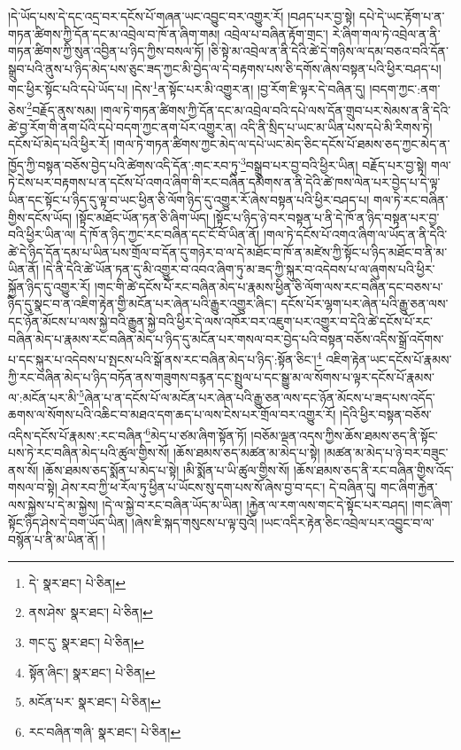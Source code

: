 །དེ་ཡོད་པས་དེ་དང་འདྲ་བར་དངོས་པོ་གཞན་ཡང་འབྱུང་བར་འགྱུར་རོ། །བཤད་པར་བྱ་སྟེ། དཔེ་དེ་ཡང་རྟོག་པ་ན་གཏན་ཚིགས་ཀྱི་དོན་དང་མ་འབྲེལ་བ་ཁོ་ན་ཞིག་གམ། འབྲེལ་པ་བཞིན་རྟོག་གྲང་། རེ་ཞིག་གལ་ཏེ་འབྲེལ་ན་ནི་གཏན་ཚིགས་ཀྱི་སུན་འབྱིན་པ་ཉིད་ཀྱིས་བསལ་ཏོ། །ཅི་སྟེ་མ་འབྲེལ་ན་ནི་དེའི་ཚེ་དེ་གཉིས་ལ་དམ་བཅའ་བའི་དོན་སྒྲུབ་པའི་ནུས་པ་ཉིད་མེད་པས་ཅུང་ཟད་ཀྱང་མི་བྱེད་ལ་དེ་བརྟགས་པས་ཅི་དགོས་ཞེས་བསྟན་པའི་ཕྱིར་བཤད་པ། གང་ཕྱིར་སྟོང་པའི་དཔེ་ཡོད་པ། །དེས་\footnote{དེ་  སྣར་ཐང་།  པེ་ཅིན། }ན་སྟོང་པར་མི་འགྱུར་ན། །བྱ་རོག་ཇི་ལྟར་དེ་བཞིན་དུ། །བདག་ཀྱང་:ནག་ཅེས་\footnote{ནས་ཤེས་  སྣར་ཐང་།  པེ་ཅིན། }བརྗོད་ནུས་སམ། །གལ་ཏེ་གཏན་ཚིགས་ཀྱི་དོན་དང་མ་འབྲེལ་བའི་དཔེ་ལས་དོན་གྲུབ་པར་སེམས་ན་ནི་དེའི་ཚེ་བྱ་རོག་གི་ནག་པོའི་དཔེ་བདག་ཀྱང་ནག་པོར་འགྱུར་ན། འདི་ནི་སྲིད་པ་ཡང་མ་ཡིན་པས་དཔེ་མི་རིགས་ཏེ། དངོས་པོ་མེད་པའི་ཕྱིར་རོ། །གལ་ཏེ་གཏན་ཚིགས་ཀྱང་མེད་ལ་དཔེ་ཡང་མེད་ཅིང་དངོས་པོ་ཐམས་ཅད་ཀྱང་མེད་ན་ཁྱོད་ཀྱི་བསྟན་བཅོས་བྱེད་པའི་ཚེགས་འདི་དོན་:གང་རབ་ཏུ་\footnote{གང་དུ་  སྣར་ཐང་།  པེ་ཅིན། }བསྒྲུབ་པར་བྱ་བའི་ཕྱིར་ཡིན། བརྗོད་པར་བྱ་སྟེ། གལ་ཏེ་ངེས་པར་བརྟགས་པ་ན་དངོས་པོ་འགའ་ཞིག་གི་རང་བཞིན་དམིགས་ན་ནི་དེའི་ཚེ་ཁས་ལེན་པར་བྱེད་པ་དེ་ལྟ་ཡིན་དང་སྟོང་པ་ཉིད་དུ་ལྟ་བ་ཡང་ཕྱིན་ཅི་ལོག་ཉིད་དུ་འགྱུར་རོ་ཞེས་བསྟན་པའི་ཕྱིར་བཤད་པ། གལ་ཏེ་རང་བཞིན་གྱིས་དངོས་ཡོད། །སྟོང་མཐོང་ཡོན་ཏན་ཅི་ཞིག་ཡོད། །སྟོང་པ་ཉིད་ཉེ་བར་བསྟན་པ་ནི་དེ་ཁོ་ན་ཉིད་བསྟན་པར་བྱ་བའི་ཕྱིར་ཡིན་ལ། དེ་ཁོ་ན་ཉིད་ཀྱང་རང་བཞིན་དང་ངོ་བོ་ཡིན་ནོ། །གལ་ཏེ་དངོས་པོ་འགའ་ཞིག་ལ་ཡོད་ན་ནི་དེའི་ཚེ་དེ་ཉིད་དོན་དམ་པ་ཡིན་པས་གྲོལ་བ་དོན་དུ་གཉེར་བ་ལ་དེ་མཐོང་བ་ཁོ་ན་མཛེས་ཀྱི་སྟོང་པ་ཉིད་མཐོང་བ་ནི་མ་ཡིན་ནོ། །དེ་ནི་དེའི་ཚེ་ཡོན་ཏན་དུ་མི་འགྱུར་བ་འབའ་ཞིག་ཏུ་མ་ཟད་ཀྱི་སྐུར་བ་འདེབས་པ་ལ་ཞུགས་པའི་ཕྱིར་སྐྱོན་ཉིད་དུ་འགྱུར་རོ། །གང་གི་ཚེ་དངོས་པོ་རང་བཞིན་མེད་པ་རྣམས་ཕྱིན་ཅི་ལོག་ལས་རང་བཞིན་དང་བཅས་པ་ཉིད་དུ་སྣང་བ་ན་འཇིག་རྟེན་གྱི་མངོན་པར་ཞེན་པའི་རྒྱུར་འགྱུར་ཞིང་། དངོས་པོར་ལྷག་པར་ཞེན་པའི་རྒྱུ་ཅན་ལས་དང་ཉོན་མོངས་པ་ལས་སྐྱེ་བའི་རྒྱུན་སྐྱེ་བའི་ཕྱིར་དེ་ལས་འཁོར་བར་འཇུག་པར་འགྱུར་བ་དེའི་ཚེ་དངོས་པོ་རང་བཞིན་མེད་པ་རྣམས་རང་བཞིན་མེད་པ་ཉིད་དུ་མངོན་པར་གསལ་བར་བྱེད་པའི་བསྟན་བཅོས་འདིས་སྒྲོ་འདོགས་པ་དང་སྐུར་པ་འདེབས་པ་སྤངས་པའི་སྒོ་ནས་རང་བཞིན་མེད་པ་ཉིད་:སྟོན་ཅིང་།\footnote{སྟོན་ཞིང་།  སྣར་ཐང་།  པེ་ཅིན། } འཇིག་རྟེན་ཡང་དངོས་པོ་རྣམས་ཀྱི་རང་བཞིན་མེད་པ་ཉིད་བཏོན་ནས་གཟུགས་བརྙན་དང་སྤྲུལ་པ་དང་སྒྱུ་མ་ལ་སོགས་པ་ལྟར་དངོས་པོ་རྣམས་ལ་:མངོན་པར་མི་\footnote{མངོན་པར་  སྣར་ཐང་།  པེ་ཅིན། }ཞེན་པ་ན་དངོས་པོ་ལ་མངོན་པར་ཞེན་པའི་རྒྱུ་ཅན་ལས་དང་ཉོན་མོངས་པ་ཟད་པས་འདོད་ཆགས་ལ་སོགས་པའི་འཆིང་བ་མཐའ་དག་ཆད་པ་ལས་ངེས་པར་གྲོལ་བར་འགྱུར་རོ། །དེའི་ཕྱིར་བསྟན་བཅོས་འདིས་དངོས་པོ་རྣམས་:རང་བཞིན་\footnote{རང་བཞིན་གཞི་  སྣར་ཐང་།  པེ་ཅིན། }མེད་པ་ཙམ་ཞིག་སྟོན་ཏོ། །བཅོམ་ལྡན་འདས་ཀྱིས་ཆོས་ཐམས་ཅད་ནི་སྟོང་པས་ཏེ་རང་བཞིན་མེད་པའི་ཚུལ་གྱིས་སོ། །ཆོས་ཐམས་ཅད་མཚན་མ་མེད་པ་སྟེ། །མཚན་མ་མེད་པ་ཉེ་བར་བཟུང་ནས་སོ། །ཆོས་ཐམས་ཅད་སྨོན་པ་མེད་པ་སྟེ། །མི་སྨོན་པ་ཡི་ཚུལ་གྱིས་སོ། །ཆོས་ཐམས་ཅད་ནི་རང་བཞིན་གྱིས་འོད་གསལ་བ་སྟེ། ཤེས་རབ་ཀྱི་ཕ་རོལ་ཏུ་ཕྱིན་པ་ཡོངས་སུ་དག་པས་སོ་ཞེས་བྱ་བ་དང་། དེ་བཞིན་དུ། གང་ཞིག་རྐྱེན་ལས་སྐྱེས་པ་དེ་མ་སྐྱེས། །དེ་ལ་སྐྱེ་བ་རང་བཞིན་ཡོད་མ་ཡིན། །རྐྱེན་ལ་རག་ལས་གང་དེ་སྟོང་པར་བཤད། །གང་ཞིག་སྟོང་ཉིད་ཤེས་དེ་བག་ཡོད་ཡིན། །ཞེས་ཇི་སྐད་གསུངས་པ་ལྟ་བུའོ། །ཡང་འདིར་རྟེན་ཅིང་འབྲེལ་པར་འབྱུང་བ་ལ་བསྙོན་པ་ནི་མ་ཡིན་ནོ། །
